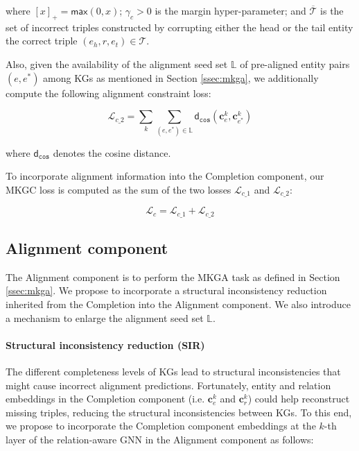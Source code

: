 \documentclass[11pt]{article}
\begin{document}
\noindent where $[x]_+=\mathsf{max}(0, x)$; $\gamma_c > 0$ is the margin hyper-parameter; and $\overline{\mathcal{T}}$ is the set of incorrect triples constructed by corrupting either the head or the tail entity the correct triple $(e_h, r, e_t) \in \mathcal{T}$.

Also, given the availability of the alignment seed set $\mathbb{L}$ of pre-aligned entity pairs $(e, e^*)$ among KGs as mentioned in Section \ref{ssec:mkga}, we additionally compute the following alignment constraint loss:

\begin{equation}
\mathcal{L}_{c\_2} =  \sum_{k} \sum_{(e, e^*)\in \mathbb{L}}  \mathsf{d}_{\mathtt{cos}}\left(\mathbf{c}^k_e, \mathbf{c}^k_{e^*}\right)
    \label{eqn:complossterm2}
\end{equation}

\noindent where $\mathsf{d}_{\mathtt{cos}}$ denotes the cosine distance. 

To incorporate alignment information into the Completion component, our MKGC loss is computed as the sum of the two losses $\mathcal{L}_{c\_1}$ and  $\mathcal{L}_{c\_2}$: 

\begin{equation}
    \mathcal{L}_{c} = \mathcal{L}_{c\_1} + \mathcal{L}_{c\_2}
\end{equation}



\subsection{Alignment component}\label{ssec:alignment}

The Alignment component is to perform the MKGA task as defined in Section \ref{ssec:mkga}. 
We propose to incorporate a structural inconsistency reduction inherited from the Completion into the Alignment component. We also introduce a mechanism to enlarge the alignment seed set $\mathbb{L}$.



\paragraph{Structural inconsistency reduction (SIR)} The different completeness levels of KGs lead to structural inconsistencies that might cause incorrect alignment predictions. Fortunately, entity and relation embeddings  in the Completion component (i.e. $\mathbf{c}_e^{k}$ and $\mathbf{c}_r^{k}$) could help reconstruct missing triples,  reducing the structural inconsistencies between KGs. To this end, we propose to  incorporate the Completion component embeddings at the $k$-th layer of the relation-aware GNN in the Alignment component as follows: 
\end{document}
